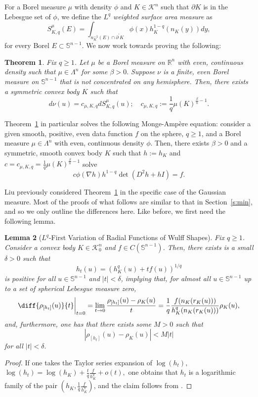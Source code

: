 \documentclass[11pt]{amsart}
\newtheorem{theorem}{Theorem}[section]
\newtheorem{lemma}[theorem]{Lemma}
\theoremstyle{definition}
\theoremstyle{remark}
\numberwithin{equation}{section}
\newcommand{\R}{\mathbb{R}}
\newcommand{\s}{\mathbb{S}}
\newcommand{\conbod}{\mathcal{K}^n}
\begin{document}
For a Borel measure $\mu$ with density $\phi$ and $K\in\conbod$ such that $\partial K$ is in the Lebesgue set of $\phi$, we define the \textit{$L^q$ weighted surface area measure} as
\begin{equation}
    \label{q_mu_sur}
    S^{\mu}_{K,q}(E)=\int_{n_K^{-1}(E)\cap \partial^\prime K}\phi\left(x\right)h_K^{1-q}(n_K(y))dy,
\end{equation}
for every Borel $E\subset \s^{n-1}$. We now work towards proving the following:
\begin{theorem}
\label{t:third_q}
Fix $q\geq 1$. Let $\mu$ be a Borel measure on $\R^n$ with even, continuous density such that $\mu \in \Lambda^n$ for some $\beta>0.$ Suppose $\nu$ is a finite, even Borel measure on $\s^{n-1}$ that is not concentrated on any hemisphere.
Then, there exists a symmetric convex body $K$ such that
$$d\nu(u)=c_{\mu,K,q} dS^{\mu}_{K,q}(u); \quad c_{\mu,K,q}:=\frac{1}{q}\mu(K)^{\frac{\beta}{n}-1}.$$
\end{theorem}

\noindent Theorem~\ref{t:third_q} in particular solves the following Monge-Amp\`ere equation: consider a given smooth, positive, even data function $f$ on the sphere, $q\geq 1$, and a Borel measure $\mu\in\Lambda^n$ with even, continuous density $\phi$. Then, there exists $\beta>0$ and a symmetric, smooth convex body $K$ such that $h:=h_K$ and $c=c_{\mu,K,q}=\frac{1}{q}\mu(K)^{\frac{\beta}{n}-1}$ solve
$$c\phi(\nabla h)h^{1-q}\det (D^2 h +h I)=f.$$

Liu \cite{JL22} previously considered Theorem~\ref{t:third_q} in the specific case of the Gaussian measure. Most of the proofs of what follows are similar to that in Section~\ref{s:min}, and so we only outline the differences here. Like before, we first need the following lemma.
\begin{lemma}[$L^q$-First Variation of Radial Functions of Wulff Shapes]
	\label{l:first_q}
	Fix $q\geq 1$. Consider a convex body $K\in\conbod_0$ and $f\in C(\s^{n-1})$. Then, there exists is a small $\delta >0$ such that $$h_t(u)=\left(h^q_K(u)+tf(u)\right)^{1/q}$$ is positive for all $u\in\s^{n-1}$ and $|t|< \delta $, implying that, for almost all $u\in\s^{n-1}$ up to a set of spherical Lebesgue measure zero,
	$$\diff{\rho_{[h_t]}(u)}{t}\bigg|_{t=0}=\lim_{t\to 0}\frac{\rho_{[h_t]}(u)-\rho_{K}(u)}{t}=\frac{1}{q}\frac{f(n_{K}(r_{K}(u)))}{h^q_K(n_K(r_K(u)))}\rho_K(u),$$
	and, furthermore, one has that there exists some $M>0$ such that $$|\rho_{[h_t]}(u)-\rho_{K}(u)|<M|t|$$ for all $|t|<\delta.$
	\end{lemma}
	\begin{proof}
	If one takes the Taylor series expansion of $\log(h_t),$ $\log(h_t)=\log(h_K)+\frac{t}{q}\frac{f}{h^q_K}+o(t),$ one obtains that $h_t$ is a logarithmic family of the pair $(h_K,\frac{1}{q}\frac{f}{h^q_K})$, and the claim follows from \cite[Lemma 4.3]{HLYZ16}.
	\end{proof}
\end{document}
